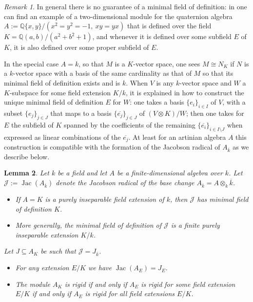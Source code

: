 \documentclass[11pt,reqno]{amsart}
\newtheorem{lemma}{Lemma}[subsection]
\theoremstyle{definition}
\theoremstyle{remark}
\newtheorem{remark}[lemma]{Remark}
\theoremstyle{definition}
\theoremstyle{plain}
\DeclareMathOperator{\Jac}{Jac}
\newcommand{\Q}{\mathbb{Q}}
\newcommand{\bark}{{\overline{k}}}
\begin{document}
\begin{remark}In general there is no guarantee of a minimal field of definition: in \cite{BR19} one can find an example of a two-dimensional module for the quaternion algebra $A:=\Q\{x,y\}/(x^2=y^2=-1,\ xy=yx)$ that is defined over the field $K=\Q(a,b)/(a^2+b^2+1)$, and whenever it is defined over some subfield $E$ of $K$, it is also defined over some proper subfield of $E$. \end{remark}

In the special case $A=k$, so that $M$ is a $K$-vector space, one sees $M\cong N_K$ if $N$ is a $k$-vector space with a basis of the same cardinality as that of $M$ so that its minimal field of definition exists and is $k$. When $V$ is any $k$-vector space and $W$ a $K$-subspace for some field extension $K/k$, it is explained in \cite[Rk.~1.1.7]{CGP15} how to construct the unique minimal field of definition $E$ for $W$: one takes a basis $\{e_i\}_{i\in I}$ of $V$, with a subset $\{e_j\}_{j\in J}$ that maps to a basis $\{\overline{e_j}\}_{j\in J}$ of $(V\otimes K)/W$; then one takes for $E$ the subfield of $K$ spanned by the coefficients of the remaining $\{\overline{e_i}\}_{i\in I\setminus J}$ when expressed as linear combinations of the $\overline{e_j}$. At least for an artinian algebra $A$ this construction is compatible with the formation of the Jacobson radical of $A_\bark$ as we describe below. 


\begin{lemma}\label{lem:mfod}
 Let $k$ be a field and let $A$ be a finite-dimensional algebra over $k$.
 Let $\mathcal{J}:=\Jac(A_{\bark})$ denote the Jacobson radical of the base change $A_{\bark} = A\otimes_k \bark$.
 \begin{itemize}
  \item[(i)] If $A=K$ is a purely inseparable field extension of $k$, then $\mathcal{J}$ has minimal field of definition $K$. 
 \item[(ii)] More generally, the minimal field of definition of $\mathcal{J}$ is a finite purely inseparable extension $K/k$.\end{itemize}
 Let $J\subseteq A_{K}$ be such that $\mathcal{J} = J_\bark$.
\begin{itemize}\item[(iii)]  For any extension $E/K$ we have $\Jac(A_E)=J_E$.
\item[(iv)] The module $A_K$ is rigid if and only if $A_E$ is rigid for some field extension $E/K$ if and only if $A_E$ is rigid for all field extensions $E/K$.
\end{itemize}
\end{lemma}
\end{document}

